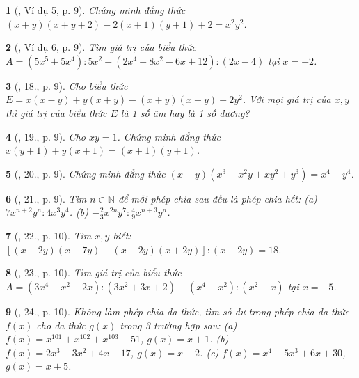 \documentclass{article}
\newtheorem{baitoan}{}
\begin{document}
\begin{baitoan}[\cite{Tuyen_Toan_8}, Ví dụ 5, p. 9]
	Chứng minh đẳng thức $(x + y)(x + y + 2) - 2(x + 1)(y + 1) + 2 = x^2y^2$.
\end{baitoan}

\begin{baitoan}[\cite{Tuyen_Toan_8}, Ví dụ 6, p. 9]
	Tìm giá trị của biểu thức $A = (5x^5 + 5x^4):5x^2 - (2x^4 - 8x^2 - 6x + 12):(2x - 4)$ tại $x = -2$.
\end{baitoan}

\begin{baitoan}[\cite{Tuyen_Toan_8}, 18., p. 9]
	Cho biểu thức $E = x(x - y) + y(x + y) - (x + y)(x - y) - 2y^2$. Với mọi giá trị của $x,y$ thì giá trị của biểu thức $E$ là 1 số âm hay là 1 số dương?
\end{baitoan}

\begin{baitoan}[\cite{Tuyen_Toan_8}, 19., p. 9]
	Cho $xy = 1$. Chứng minh đẳng thức $x(y + 1) + y(x + 1) = (x + 1)(y + 1)$.
\end{baitoan}

\begin{baitoan}[\cite{Tuyen_Toan_8}, 20., p. 9]
	Chứng minh đẳng thức $(x - y)(x^3 + x^2y + xy^2 + y^3) = x^4 - y^4$.
\end{baitoan}

\begin{baitoan}[\cite{Tuyen_Toan_8}, 21., p. 9]
	Tìm $n\in\mathbb{N}$ để mỗi phép chia sau đều là phép chia hết: (a) $7x^{n+2}y^n:4x^3y^4$. (b) $-\frac{2}{3}x^{2n}y^7:\frac{4}{9}x^{n+3}y^n$.
\end{baitoan}

\begin{baitoan}[\cite{Tuyen_Toan_8}, 22., p. 10]
	Tìm $x,y$ biết: $[(x - 2y)(x - 7y) - (x - 2y)(x + 2y)]:(x - 2y) = 18$.
\end{baitoan}

\begin{baitoan}[\cite{Tuyen_Toan_8}, 23., p. 10]
	Tìm giá trị của biểu thức $A = (3x^4 - x^2 - 2x):(3x^2 + 3x + 2) + (x^4 - x^2):(x^2 - x)$ tại $x = -5$.
\end{baitoan}

\begin{baitoan}[\cite{Tuyen_Toan_8}, 24., p. 10]
	Không làm phép chia đa thức, tìm số dư trong phép chia đa thức $f(x)$ cho đa thức $g(x)$ trong 3 trường hợp sau: (a) $f(x) = x^{101} + x^{102} + x^{103} + 51$, $g(x) = x + 1$. (b) $f(x) = 2x^3 - 3x^2 + 4x - 17$, $g(x) = x - 2$. (c) $f(x) = x^4 + 5x^3 + 6x + 30$, $g(x) = x + 5$.
\end{baitoan}
\end{document}
